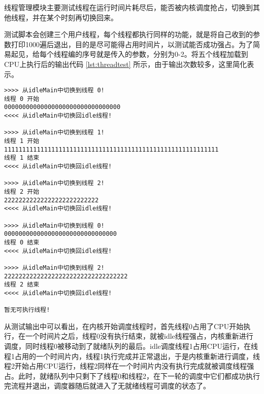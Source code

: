 线程管理模块主要测试线程在运行时间片耗尽后，能否被内核调度抢占，切换到其他线程，并在某个时刻再切换回来。

测试脚本会创建三个用户线程，每个线程都执行同样的功能，就是将自己收到的参数打印1000遍后退出，目的是尽可能得占用时间片，以测试能否成功强占。为了简易起见，给每个线程编的序号就是传入的参数，分别为0-2。将五个线程加载到CPU上执行后的输出代码 \ref{lst:threadtest} 所示，由于输出次数较多，这里简化表示。

\begin{minipage}[c]{0.95\textwidth}
\begin{lstlisting}[caption={线程调度测试}, label={lst:threadtest}]
>>>> 从idleMain中切换到线程 0!
线程 0 开始
00000000000000000000000000000000
<<<< 从idleMain中切换回idle线程!

>>>> 从idleMain中切换到线程 1!
线程 1 开始
11111111111111111111111111111111111111111111111111111111111
线程 1 结束
<<<< 从idleMain中切换回idle线程!

>>>> 从idleMain中切换到线程 2!
线程 2 开始
22222222222222222222222222
<<<< 从idleMain中切换回idle线程!

>>>> 从idleMain中切换到线程 0!
0000000000000000000000000000000
线程 0 结束
<<<< 从idleMain中切换回idle线程!

>>>> 从idleMain中切换到线程 2!
2222222222222222222222222222222222
线程 2 结束
<<<< 从idleMain中切换回idle线程!

暂无可执行线程!
\end{lstlisting}
\end{minipage}

从测试输出中可以看出，在内核开始调度线程时，首先线程0占用了CPU开始执行，在一个时间片之后，线程0没有执行结束，就被idle线程强占，内核重新进行调度，同时线程0被移动到了就绪队列的最后。idle调度线程1占用CPU运行，在线程1占用的一个时间片内，线程1执行完成并正常退出，于是内核重新进行调度，线程2开始占用CPU运行，线程2同样在一个时间片内没有执行完成就被调度线程强占。此时，就绪队列中只剩下了线程0和线程2，在下一轮的调度中它们都成功执行完流程并退出，调度器随后就进入了无就绪线程可调度的状态了。